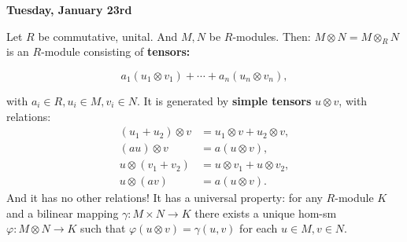 \documentclass[12pt]{amsbook}
\theoremstyle{plain}
\numberwithin{section}{chapter}
\numberwithin{equation}{chapter}
\theoremstyle{definition}
\theoremstyle{remark}
\newcommand{\bee}{\begin{equation}\begin{aligned}}
\newcommand{\eee}{\end{aligned}\end{equation}}
\newcommand{\tens}{\otimes}
\renewcommand{\phi}{\varphi}
\begin{document}
 \textbf{Tuesday, January 23rd}
 
\vspace{5mm}

Let $R$ be commutative, unital. And $M,N$ be $R$-modules. Then:
$
M \otimes N = M \otimes_R N$ is an $R$-module consisting of \textbf{tensors: } 

$$
a_1(u_1 \otimes v_1) + \cdots + a_n(u_n \otimes v_n),
$$

with $a_i \in R,u_i \in M,v_i \in N$. It is generated by \textbf{simple tensors} $u \otimes v$, with relations: 
 \bee
  (u_1 + u_2) \otimes v &= u_1 \otimes v + u_2 \tens v,\\
 (au) \otimes v &= a(u \otimes v),\\
 u \otimes (v_1 + v_2) &= u\otimes v_1 
+ u\otimes v_2,\\
u\otimes (av) &= a(u \otimes v).
\eee
And it has no other relations! It has a universal property: for any $R$-module $K$ and a bilinear mapping $\gamma: M \times N \to K$ there exists a unique hom-sm $\phi:M \otimes N \to K$ such that $\phi(u \otimes v) = \gamma(u,v)$ for each $u \in M,v \in N$. 
\end{document}
